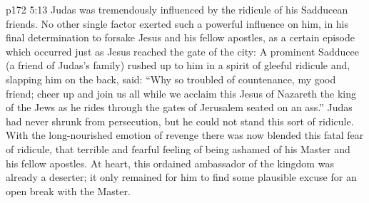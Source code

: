 \vs p172 5:13 Judas was tremendously influenced by the ridicule of his Sadducean friends. No other single factor exerted such a powerful influence on him, in his final determination to forsake Jesus and his fellow apostles, as a certain episode which occurred just as Jesus reached the gate of the city: A prominent Sadducee (a friend of Judas’s family) rushed up to him in a spirit of gleeful ridicule and, slapping him on the back, said: “Why so troubled of countenance, my good friend; cheer up and join us all while we acclaim this Jesus of Nazareth the king of the Jews as he rides through the gates of Jerusalem seated on an ass.” Judas had never shrunk from persecution, but he could not stand this sort of ridicule. With the long\hyp{}nourished emotion of revenge there was now blended this fatal fear of ridicule, that terrible and fearful feeling of being ashamed of his Master and his fellow apostles. At heart, this ordained ambassador of the kingdom was already a deserter; it only remained for him to find some plausible excuse for an open break with the Master.
